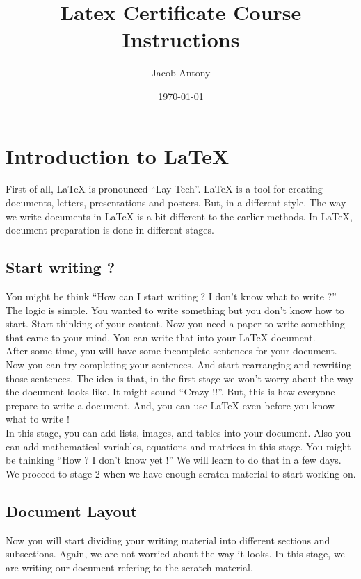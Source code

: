 \documentclass{article}
\title{Latex Certificate Course Instructions}
\author{Jacob Antony}
\date{\today}
\begin{document}
\maketitle

\section{Introduction to LaTeX}
	First of all, LaTeX is pronounced ``Lay-Tech''.
	LaTeX is a tool for creating documents, letters, presentations and posters.
	But, in a different style.
	The way we write documents in LaTeX is a bit different to the earlier methods.
	In LaTeX, document preparation is done in different stages.

\subsection{Start writing ?}
	You might be think ``How can I start writing ? I don't know what to write ?''
	The logic is simple.
	You wanted to write something but you don't know how to start.
	Start thinking of your content. 
	Now you need a paper to write something that came to your mind.
	You can write that into your LaTeX document.\\
	
	After some time, you will have some incomplete sentences for your document.
	Now you can try completing your sentences.
	And start rearranging and rewriting those sentences.
	The idea is that, in the first stage we won't worry about the way the document looks like.
	It might sound ``Crazy !!''.
	But, this is how everyone prepare to write a document.
	And, you can use LaTeX even before you know what to write !\\

	In this stage, you can add lists, images, and tables into your document.
	Also you can add mathematical variables, equations and matrices in this stage.
	You might be thinking ``How ? I don't know yet !''
	We will learn to do that in a few days.
	We proceed to stage 2 when we have enough scratch material to start working on.

\subsection{Document Layout}
	Now you will start dividing your writing material into different sections and subsections.
	Again, we are not worried about the way it looks.
	In this stage, we are writing our document refering to the scratch material.\\
\end{document}
